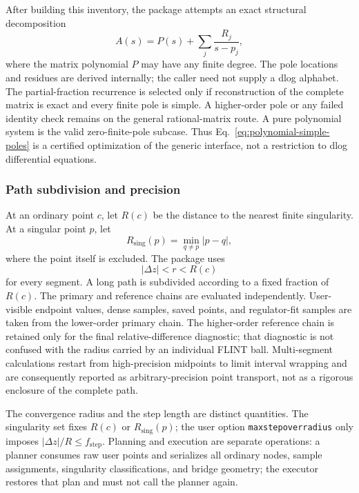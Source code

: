 \documentclass[11pt]{article}
\renewcommand{\_}{\origunderscore\allowbreak}
\begin{document}
After building this inventory, the package attempts an exact structural decomposition
\begin{equation}
 A(s)=P(s)+\sum_j\frac{R_j}{s-p_j},
 \label{eq:polynomial-simple-poles}
\end{equation}
where the matrix polynomial $P$ may have any finite degree.  The pole locations and residues
are derived internally; the caller need not supply a dlog alphabet.  The partial-fraction
recurrence is selected only if reconstruction of the complete matrix is exact and every
finite pole is simple.  A higher-order pole or any failed identity check remains on the
general rational-matrix route.  A pure polynomial system is the valid zero-finite-pole
subcase.  Thus Eq.~\eqref{eq:polynomial-simple-poles} is a certified optimization of the
generic interface, not a restriction to dlog differential equations.

\subsubsection{Path subdivision and precision}
\label{subsec:path}

At an ordinary point $c$, let $R(c)$ be the distance to the nearest finite singularity.  At
a singular point $p$, let
\begin{equation}
 R_{\mathrm{sing}}(p)=\min_{q\ne p}|p-q|,
\end{equation}
where the point itself is excluded.  The package uses
\begin{equation}
  |\Delta z|<r< R(c)
\end{equation}
for every segment.  A long path is subdivided according to a fixed fraction of $R(c)$.  The
primary and reference chains are evaluated independently.  User-visible endpoint values,
dense samples, saved points, and regulator-fit samples are taken from the lower-order primary
chain.  The higher-order reference chain is retained only for the final relative-difference
diagnostic; that diagnostic is not confused with the radius carried by an individual
FLINT ball.  Multi-segment calculations restart from high-precision midpoints to limit
interval wrapping and are consequently reported as arbitrary-precision point transport,
not as a rigorous enclosure of the complete path.

The convergence radius and the step length are distinct quantities.  The singularity set
fixes $R(c)$ or $R_{\mathrm{sing}}(p)$; the user option
\texttt{max\_step\_over\_radius} only imposes
$|\Delta z|/R\leq f_{\mathrm{step}}$.  Planning and execution are separate operations:
a planner consumes raw user points and serializes all ordinary nodes, sample assignments,
singularity classifications, and bridge geometry; the executor restores that plan and must
not call the planner again.
\end{document}

